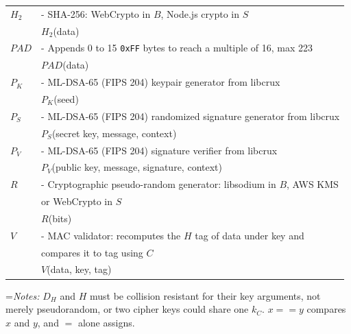 \documentclass{article}
\newlength{\stanzagap}
\newlength{\notegap}
\newlength{\stanzawidth}
\newlength{\stanzabox}
\newenvironment{stanza}[1][\stanzawidth]
  {\par\addvspace{\stanzagap}%
   \setlength{\stanzabox}{\dimexpr\linewidth-\parindent\relax}%
   \ifdim\stanzabox>#1\setlength{\stanzabox}{#1}\fi
   \noindent\hspace*{\parindent}\begin{minipage}{\stanzabox}}
  {\end{minipage}\par\addvspace{\stanzagap}}
\begin{document}
\begin{stanza}
\begin{tabular}{@{}p{5mm} l}
$H_2$ & \textrm{ - SHA-256: WebCrypto in }$B$\textrm{, Node.js crypto in }$S$ \\
& \phantom{\textrm{ - }}$H_2$\textrm{(data)} \\
$\mathit{PAD}$ & \textrm{ - Appends 0 to 15 }\texttt{0xFF}\textrm{ bytes to reach a multiple of 16, max 223} \\
& \phantom{\textrm{ - }}$\mathit{PAD}$\textrm{(data)} \\
$P_K$ & \textrm{ - ML-DSA-65 (FIPS 204) keypair generator from libcrux} \\
& \phantom{\textrm{ - }}$P_K$\textrm{(seed)} \\
$P_S$ & \textrm{ - ML-DSA-65 (FIPS 204) randomized signature generator from libcrux} \\
& \phantom{\textrm{ - }}$P_S$\textrm{(secret key, message, context)} \\
$P_V$ & \textrm{ - ML-DSA-65 (FIPS 204) signature verifier from libcrux} \\
& \phantom{\textrm{ - }}$P_V$\textrm{(public key, message, signature, context)} \\
$R$ & \textrm{ - Cryptographic pseudo-random generator: libsodium in }$B$\textrm{, AWS KMS} \\
& \phantom{\textrm{ - }}\textrm{or WebCrypto in }$S$ \\
& \phantom{\textrm{ - }}$R$\textrm{(bits)} \\
$V$ & \textrm{ - MAC validator: recomputes the }$H$\textrm{ tag of data under key and} \\
& \phantom{\textrm{ - }}\textrm{compares it to tag using }$C$ \\
& \phantom{\textrm{ - }}$V$\textrm{(data, key, tag)} \\
\end{tabular}

\vspace{\notegap}

{\leftskip=\parindent\noindent\textit{Notes:} $D_H$ and $H$ must be collision resistant for their key arguments, not merely \mbox{pseudorandom}, or two cipher keys could share one $k_C$. $x == y$ compares $x$ and $y$, and $=$ alone assigns.\par}
\end{stanza}
\end{document}
